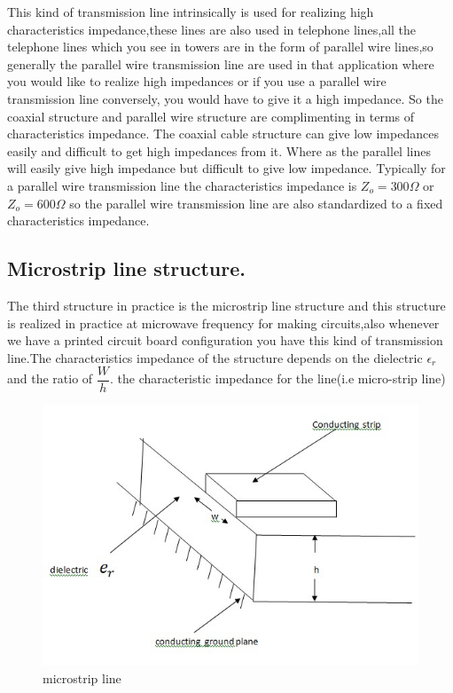 This kind of transmission line intrinsically is used for realizing high characteristics impedance,these lines are also used in telephone lines,all the telephone lines which you see in towers are in the form of parallel wire lines,so generally the parallel wire transmission line are used in that application where you would like to realize high impedances or if you use a parallel wire transmission line conversely, you would have to give it a high impedance. So the coaxial structure and parallel wire structure are complimenting in terms of characteristics impedance. The coaxial cable structure can give low impedances easily and difficult to get high impedances from it. Where as the parallel lines will easily give high impedance but difficult to give low impedance. Typically for a parallel wire transmission line the characteristics impedance is $Z_o=300\Omega$ or $Z_o=600\Omega$ so the parallel wire transmission line are also standardized to a fixed characteristics impedance.

\subsection{Microstrip line structure.}
The third structure in practice is the microstrip line structure and this  structure is realized in practice at microwave frequency for making circuits,also whenever we have a printed circuit board configuration you have this kind of transmission line.The characteristics impedance of the structure depends on the dielectric $\epsilon_{r}$ and the ratio of $\dfrac{W}{h}$. the characteristic impedance for the line(i.e micro-strip line)
\begin{figure}[h]
\centering
\includegraphics[width=1\linewidth]{./graphics/microstrip}
\caption{microstrip line}
\end{figure}

